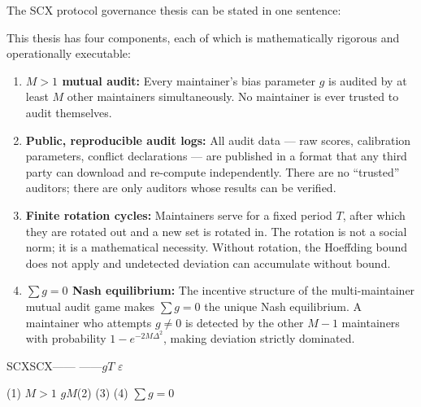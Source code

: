 \documentclass[12pt,a4paper]{article}
\theoremstyle{remark}
\begin{document}
The SCX protocol governance thesis can be stated in one sentence:

\begin{center}
\end{center}

\noindent This thesis has four components, each of which is mathematically
rigorous and operationally executable:

\begin{enumerate}[label=(\arabic*), leftmargin=*]
    \item \textbf{$M > 1$ mutual audit:} Every maintainer's bias parameter $g$
          is audited by at least $M$ other maintainers simultaneously. No
          maintainer is ever trusted to audit themselves.
    \item \textbf{Public, reproducible audit logs:} All audit data — raw scores,
          calibration parameters, conflict declarations — are published in a
          format that any third party can download and re-compute independently.
          There are no ``trusted'' auditors; there are only auditors whose
          results can be verified.
    \item \textbf{Finite rotation cycles:} Maintainers serve for a fixed period
          $T$, after which they are rotated out and a new set is rotated in.
          The rotation is not a social norm; it is a mathematical necessity.
          Without rotation, the Hoeffding bound does not apply and undetected
          deviation can accumulate without bound.
    \item \textbf{$\sum g = 0$ Nash equilibrium:} The incentive structure of the
          multi-maintainer mutual audit game makes $\sum g = 0$ the unique Nash
          equilibrium. A maintainer who attempts $g \neq 0$ is detected by the
          other $M-1$ maintainers with probability $1 - e^{-2M\Delta^2}$, making
          deviation strictly dominated.
\end{enumerate}

\noindent\textbf{}
SCXSCX——
——$g$$T$
$\varepsilon$

(1) $M>1$
$g$$M$(2) (3) 
(4) $\sum g = 0$
\end{document}
